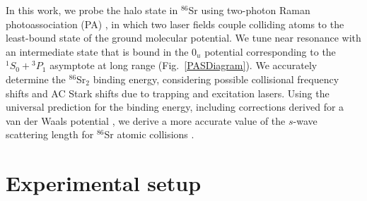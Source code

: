 In this work, we probe the halo state in $^{86}$Sr using two-photon Raman photoassociation (PA) \cite{jtl06}, in which two laser fields couple colliding atoms to the least-bound state of the ground molecular potential. We tune near resonance with an intermediate state that is bound in the $0_u$ potential  corresponding to the $^1S_0+ {^3P_1}$ asymptote at long range \cite{mmp08} (Fig.\ \ref{PASDiagram}). We accurately determine the $^{86}$Sr$_2$ binding energy, considering possible collisional frequency shifts and AC Stark shifts due to trapping and excitation lasers. Using the universal prediction for the binding energy, including corrections derived for a van der Waals potential \cite{gfl93,gao01,gao04}, we derive a more accurate value of the $s$-wave scattering length for $^{86}$Sr atomic collisions \cite{skt10,mmp08}.




\section{Experimental setup}
\label{sec:lowE_setup}

